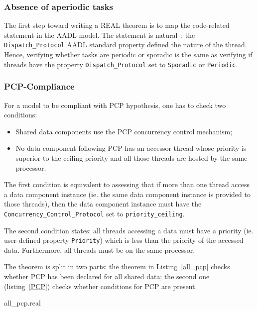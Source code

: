 \subsubsection {Absence of aperiodic tasks}

The first step toward writing a REAL theorem is to map the
code-related statement in the AADL model. The statement is
natural~: the \texttt{Dispatch\_Protocol} AADL standard property
defined the nature of the thread. Hence, verifying whether tasks are
periodic or sporadic is the same as verifying if threads have the
property \texttt{Dispatch\_Protocol} set to \texttt{Sporadic} or
\texttt{Periodic}.

\paragraph{}


\subsubsection {PCP-Compliance}

For a model to be compliant with PCP hypothesis, one has to check two
conditions:

\begin{itemize}
\item Shared data components use the PCP concurrency control
  mechanism;

\item No data component following PCP has an accessor thread whose
  priority is superior to the ceiling priority and all those threads
  are hosted by the same processor.
\end{itemize}

The first condition is equivalent to assessing that if more than
one thread access a data component instance (ie. the same data
component instance is provided to those threads), then the data
component instance must have the
\texttt{Concurrency\_Control\_Protocol} set to
\texttt{priority\_ceiling}.

The second condition states: all threads accessing a data must have
a priority (ie. user-defined property \texttt{Priority}) which is less
than the priority of the accessed data. Furthermore, all threads must
be on the same processor.

The theorem is split in two parts: the theorem in Listing~\ref{all_pcp}
checks whether PCP has been declared for all shared data; the second
one (listing~\ref{PCP}) checks whether conditions for PCP are present.


{all_pcp.real}


